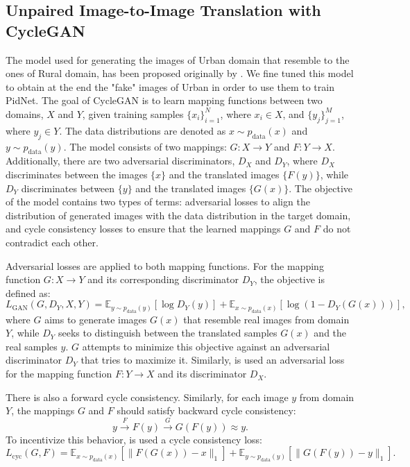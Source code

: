 \documentclass[10pt,twocolumn,letterpaper]{article}
\begin{document}
\subsection{Unpaired Image-to-Image Translation with CycleGAN}
The model used for generating the images of Urban domain that resemble to the ones of Rural domain, has been proposed originally by \cite{zhu2020cyclegan}. We fine tuned this model to obtain at the end the "fake" images of Urban in order to use them to train PidNet.
The goal of CycleGAN is to learn mapping functions between two domains, \(X\) and \(Y\), given training samples \(\{ x_i \}_{i=1}^N\), where \(x_i \in X\), and \(\{ y_j \}_{j=1}^M\), where \(y_j \in Y\). The data distributions are denoted as \(x \sim p_{\text{data}}(x)\) and \(y \sim p_{\text{data}}(y)\). The model consists of two mappings: \(G: X \rightarrow Y\) and \(F: Y \rightarrow X\). Additionally, there are two adversarial discriminators, \(D_X\) and \(D_Y\), where \(D_X\) discriminates between the images \(\{ x \}\) and the translated images \(\{ F(y) \}\), while \(D_Y\) discriminates between \(\{ y \}\) and the translated images \(\{ G(x) \}\). The objective of the model contains two types of terms: adversarial losses to align the distribution of generated images with the data distribution in the target domain, and cycle consistency losses to ensure that the learned mappings \(G\) and \(F\) do not contradict each other.

Adversarial losses are applied to both mapping functions. For the mapping function \(G: X \rightarrow Y\) and its corresponding discriminator \(D_Y\), the objective is defined as:
\[
L_{\text{GAN}}(G, D_Y, X, Y) = \mathbb{E}_{y \sim p_{\text{data}}(y)} \left[ \log D_Y(y) \right] + \mathbb{E}_{x \sim p_{\text{data}}(x)} \left[ \log(1 - D_Y(G(x))) \right],
\]
where \(G\) aims to generate images \(G(x)\) that resemble real images from domain \(Y\), while \(D_Y\) seeks to distinguish between the translated samples \(G(x)\) and the real samples \(y\). \(G\) attempts to minimize this objective against an adversarial discriminator \(D_Y\) that tries to maximize it.
Similarly, is used an adversarial loss for the mapping function \(F: Y \rightarrow X\) and its discriminator \(D_X\).
 
There is also a forward cycle consistency. Similarly, for each image \( y \) from domain \( Y \), the mappings \( G \) and \( F \) should satisfy backward cycle consistency:
\[
y \xrightarrow{F} F(y) \xrightarrow{G} G(F(y)) \approx y.
\]
To incentivize this behavior, is used a cycle consistency loss:
\[
L_{\text{cyc}}(G, F) = \mathbb{E}_{x \sim p_{\text{data}}(x)} \left[ \| F(G(x)) - x \|_1 \right] + \mathbb{E}_{y \sim p_{\text{data}}(y)} \left[ \| G(F(y)) - y \|_1 \right].
\]
\end{document}
